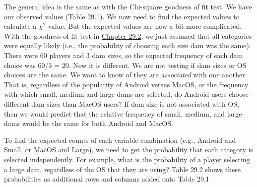 \documentclass[
  openany]{krantz}
\begin{document}
The general idea is the same as with the Chi-square goodness of fit test.
We have our observed values (Table 29.1).
We now need to find the expected values to calculate a \(\chi^{2}\) value.
But the expected values are now a bit more complicated.
With the goodness of fit test in \protect\hyperlink{chi-squared-goodness-of-fit}{Chapter 29.2}, we just assumed that all categories were equally likely (i.e., the probability of choosing each size dam was the same).
There were 60 players and 3 dam sizes, so the expected frequency of each dam choice was 60/3 = 20.
Now it is different.
We are not testing if dam sizes or OS choices are the same.
We want to know of they are \emph{associated} with one another.
That is, regardless of the popularity of Android versus MacOS, or the frequency with which small, medium and large dams are selected, do Android users choose different dam sizes than MacOS users?
If dam size is not associated with OS, then we would predict that the relative frequency of small, medium, and large dams would be the same for both Android and MacOS.

To find the expected counts of each variable combination (e.g., Android and Small, or MacOS and Large), we need to get the probability that each category is selected independently.
For example, what is the probability of a player selecting a large dam, regardless of the OS that they are using?
Table 29.2 shows these probabilities as additional rows and columns added onto Table 29.1
\end{document}
